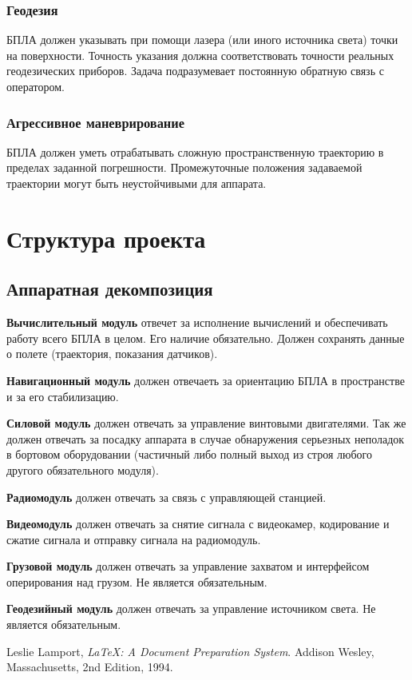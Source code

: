 \documentclass[utf8]{report}
\begin{document}
\subsection{Геодезия}
БПЛА должен указывать при помощи лазера (или иного источника света) точки на поверхности. Точность указания должна соответствовать точности реальных геодезических приборов. Задача подразумевает постоянную обратную связь с оператором.

\subsection{Агрессивное маневрирование}
БПЛА должен уметь отрабатывать сложную пространственную траекторию в пределах заданной погрешности. Промежуточные положения задаваемой траектории могут быть неустойчивыми для аппарата.

\chapter{Структура проекта}

\section{Аппаратная декомпозиция}

\textbf{Вычислительный модуль} отвечет за исполнение вычислений и обеспечивать работу всего БПЛА в целом. Его наличие обязательно. Должен сохранять данные о полете (траектория, показания датчиков).

\textbf{Навигационный модуль} должен отвечаеть за ориентацию БПЛА в пространстве и за его стабилизацию.

\textbf{Силовой модуль} должен отвечать за управление винтовыми двигателями. Так же должен отвечать за посадку аппарата в случае обнаружения серьезных неполадок в бортовом оборудовании (частичный либо полный выход из строя любого другого обязательного модуля).

\textbf{Радиомодуль} должен отвечать за связь с управляющей станцией.

\textbf{Видеомодуль} должен отвечать за снятие сигнала с видеокамер, кодирование и сжатие сигнала и отправку сигнала на радиомодуль.

\textbf{Грузовой модуль} должен отвечать за управление захватом и интерфейсом оперирования над грузом. Не является обязательным.

\textbf{Геодезийный модуль} должен отвечать за управление источником света. Не является обязательным.


\begin{thebibliography}{9}
      Leslie Lamport,
      \emph{\LaTeX: A Document Preparation System}.
      Addison Wesley, Massachusetts,
      2nd Edition,
      1994.
 
\end{thebibliography}
 
\end{document}
